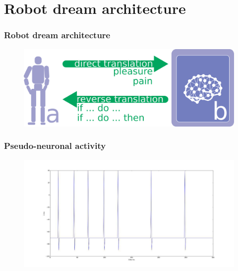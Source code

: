 \documentclass[12pt, aspectratio=169]{beamer}
\begin{document}
\section{Robot dream architecture}

\begin{frame}
\frametitle{Robot dream architecture}
\begin{figure}
\includegraphics[width=0.8\linewidth]{robot-dream_translations}
\end{figure}
\end{frame}


\begin{frame}
\frametitle{Pseudo-neuronal activity}
\begin{figure}
\includegraphics[width=0.8\linewidth]{pseudo-neuronal-activity}
\end{figure}
\end{frame}

\end{document}
